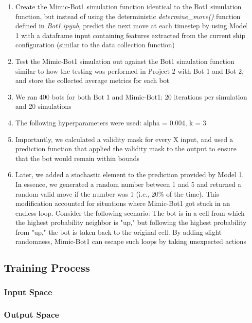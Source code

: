 \documentclass[11pt]{article}
\begin{document}
\begin{enumerate}
\begin{enumerate}
        \item Create the Mimic-Bot1 simulation function identical to the Bot1 simulation function, but instead of using the deterministic \emph{determine\_move()} function defined in \emph{Bot1.ipynb}, predict the next move at each timestep by using Model 1 with a dataframe input containing features extracted from the current ship configuration (similar to the data collection function)
        \item Test the Mimic-Bot1 simulation out against the Bot1 simulation function similar to how the testing was performed in Project 2 with Bot 1 and Bot 2, and store the collected average metrics for each bot
        \item We ran 400 bots for both Bot 1 and Mimic-Bot1: 20 iterations per simulation and 20 simulations
        \item The following hyperparameters were used: alpha = 0.004, k = 3
        \item Importantly, we calculated a validity mask for every X input, and used a prediction function that applied the validity mask to the output to ensure that the bot would remain within bounds
        \item Later, we added a stochastic element to the prediction provided by Model 1. In essence, we generated a random number between 1 and 5 and returned a random valid move if the number was 1 (i.e., 20\% of the time). This modification accounted for situations where Mimic-Bot1 got stuck in an endless loop. Consider the following scenario: The bot is in a cell from which the highest probability neighbor is "up," but following the highest probability from "up," the bot is taken back to the original cell. By adding slight randomness, Mimic-Bot1 can escape such loops by taking unexpected actions
    \end{enumerate}
\end{enumerate}

\subsection{Training Process}

\subsubsection{Input Space}

\subsubsection{Output Space}
\end{document}
